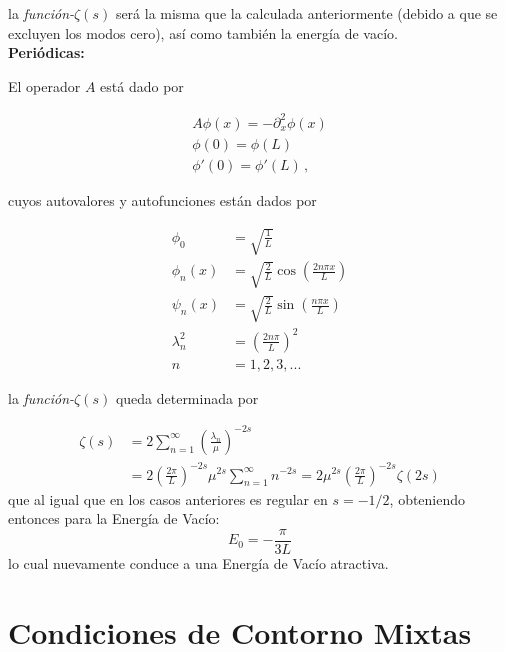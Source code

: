 la {\it función-$\zeta (s)$} será la misma que la calculada anteriormente (debido a que se excluyen los modos cero), así como también la energía de vacío. \\

\textbf{Periódicas:}

El operador $A$ está dado por

\begin{equation}
\begin{array}{c}
	A \phi (x) = - \partial _x ^2 \phi (x) \\[5pt]
    \phi (0) = \phi (L)  \\[5pt]
    \phi ' (0) = \phi ' (L) \, ,
\end{array}
\end{equation}

cuyos autovalores y autofunciones están dados por

\begin{equation}
\begin{aligned}
	\phi _{0} &= \sqrt{\frac{1}{L}} \\[5pt]
	\phi _{n} (x) &= \sqrt{\frac{2}{L}} \cos \left( \frac{2 n \pi x}{L} \right) \\[5pt]
	\psi _n (x) &=\sqrt{\frac{2}{L}} \sin \left( \frac{n \pi x}{L} \right) \\[5pt]
	\lambda _n ^2 &= \left( \frac{2 n \pi }{L} \right) ^2 \\[5pt]
	n &= 1,2,3, ...
\end{aligned}
\end{equation}

la {\it función-$\zeta  (s)$} queda determinada por

\begin{equation}
\begin{aligned}
\zeta  (s) &= 
2 \sum _{n=1} ^{\infty} \left( \frac{\lambda _n}{\mu} \right)^{-2s} \\[5pt]
&=  2 \left( \frac{2 \pi}{L} \right) ^{-2s} \mu ^{2s} \sum _{n=1} ^{\infty} n ^{-2s} =  
2 \mu ^{2s} \left( \frac{2 \pi}{L} \right) ^{-2s} \zeta (2s)
\end{aligned}
\end{equation}
que al igual que en los casos anteriores es regular en $s=-1/2$, obteniendo entonces para la Energía de Vacío:
\begin{equation}
E _0 = - \frac{\pi}{3 L}
\end{equation}
lo cual nuevamente conduce a una Energía de Vacío atractiva.

\section{Condiciones de Contorno Mixtas}

